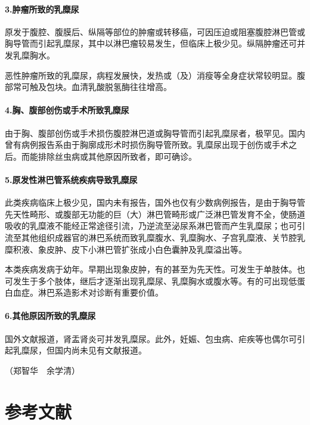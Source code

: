 \paragraph{3.肿瘤所致的乳糜尿}

原发于腹腔、腹膜后、纵隔等部位的肿瘤或转移癌，可因压迫或阻塞腹腔淋巴管或胸导管而引起乳糜尿，其中以淋巴瘤较易发生，但临床上极少见。纵隔肿瘤还可并发乳糜胸水。

恶性肿瘤所致的乳糜尿，病程发展快，发热或（及）消瘦等全身症状常较明显。腹部常可触及包块。血清乳酸脱氢酶往往增高。

\paragraph{4.胸、腹部创伤或手术所致乳糜尿}

由于胸、腹部创伤或手术损伤腹腔淋巴道或胸导管而引起乳糜尿者，极罕见。国内曾有病例报告系由于胸廓成形术时损伤胸导管所致。乳糜尿出现于创伤或手术之后。而能排除丝虫病或其他原因所致者，即可确诊。

\paragraph{5.原发性淋巴管系统疾病导致乳糜尿}

此类疾病临床上极少见，国内未有报告，国外也仅有少数病例报告，是由于胸导管先天性畸形、或腹部无功能的巨（大）淋巴管畸形或广泛淋巴管发育不全，使肠道吸收的乳糜液不能经正常途径引流，乃逆流至泌尿系淋巴管而产生乳糜尿；也可引流至其他组织成器官的淋巴系统而致乳糜腹水、乳糜胸水、子宫乳糜液、关节腔乳糜积液、象皮肿、皮下小淋巴管扩张成小白色囊肿及乳糜溢出等。

本类疾病发病于幼年。早期出现象皮肿，有的甚至为先天性。可发生于单肢体。也可发生于多个肢体，继后才逐渐出现乳糜尿、乳糜胸水或腹水等。有的可出现低蛋白血症。淋巴系造影术对诊断有重要价值。

\paragraph{6.其他原因所致的乳糜尿}

国外文献报道，肾盂肾炎可并发乳糜尿。此外，妊娠、包虫病、疟疾等也偶尔可引起乳糜尿，但国内尚未见有文献报道。

（郑智华　余学清）

\protect\hypertarget{text00287.html}{}{}

\section{参考文献}


